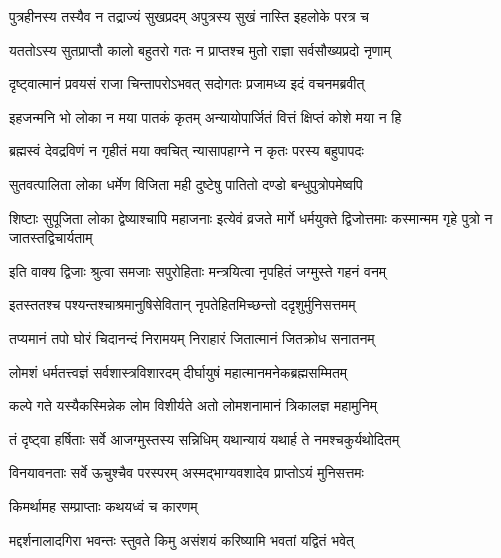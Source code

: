 \twolineshloka
{पुत्रहीनस्य तस्यैव न तद्राज्यं सुखप्रदम्}
{अपुत्रस्य सुखं नास्ति इहलोके परत्र च} %

\twolineshloka
{यततोऽस्य सुतप्राप्तौ कालो बहुतरो गतः}
{न प्राप्तश्च मुतो राज्ञा सर्वसौख्यप्रदो नृणाम्} %

\twolineshloka
{दृष्ट्वात्मानं प्रवयसं राजा चिन्तापरोऽभवत्}
{सदोगतः प्रजामध्य इदं वचनमब्रवीत्} %

\twolineshloka
{इहजन्मनि भो लोका न मया पातकं कृतम्}
{अन्यायोपार्जितं वित्तं क्षिप्तं कोशे मया न हि} %

\twolineshloka
{ब्रह्मस्वं देवद्रविणं न गृहीतं मया क्वचित्}
{न्यासापहाग्ने न कृतः परस्य बहुपापदः} %

\twolineshloka
{सुतवत्पालिता लोका धर्मेण विजिता मही}
{दुष्टेषु पातितो दण्डो बन्धुपुत्रोपमेष्वपि} %


\threelineshloka
{शिष्टाः सुपूजिता लोका द्वेष्याश्चापि महाजनाः}
{इत्येवं व्रजते मार्गे धर्मयुक्ते द्विजोत्तमाः}
{कस्मान्मम गृहे पुत्रो न जातस्तद्विचार्यताम्} %

\twolineshloka
{इति वाक्य द्विजाः श्रुत्वा समजाः सपुरोहिताः}
{मन्त्रयित्वा नृपहितं जग्मुस्ते गहनं वनम्} %

\twolineshloka
{इतस्ततश्च पश्यन्तश्चाश्रमानुषिसेवितान्}
{नृपतेहितमिच्छन्तो ददृशुर्मुनिसत्तमम्} %

\twolineshloka
{तप्यमानं तपो घोरं चिदानन्दं निरामयम्}
{निराहारं जितात्मानं जितक्रोध सनातनम्} %

\twolineshloka
{लोमशं धर्मतत्त्वज्ञं सर्वशास्त्रविशारदम्}
{दीर्घायुषं महात्मानमनेकब्रह्मसम्मितम्} %

\twolineshloka
{कल्पे गते यस्यैकस्मिन्नेक लोम विशीर्यते}
{अतो लोमशनामानं त्रिकालज्ञ महामुनिम्} %

\twolineshloka
{तं दृष्ट्वा हर्षिताः सर्वे आजग्मुस्तस्य सन्निधिम्}
{यथान्यायं यथार्ह ते नमश्चकुर्यथोदितम्} %

\twolineshloka
{विनयावनताः सर्वे ऊचुश्चैव परस्परम्}
{अस्मद्भाग्यवशादेव प्राप्तोऽयं मुनिसत्तमः} %



\onelineshloka
{किमर्थामह सम्प्राप्ताः कथयध्वं च कारणम्} %

\twolineshloka
{मद्दर्शनालादगिरा भवन्तः स्तुवते किमु}
{असंशयं करिष्यामि भवतां यद्वितं भवेत्} %



